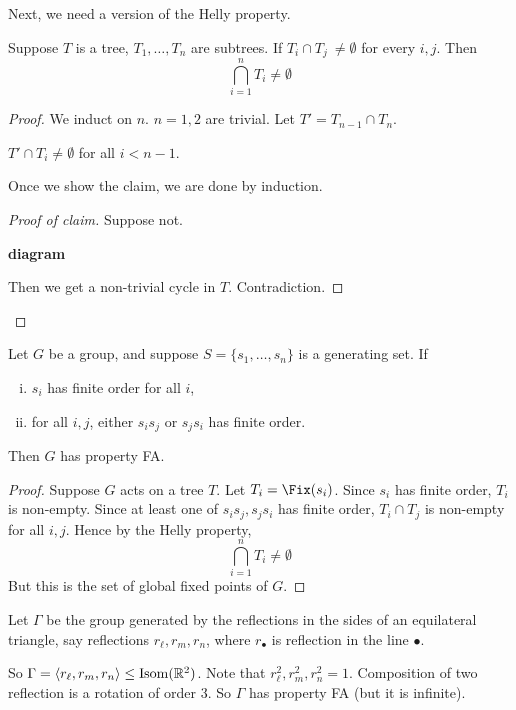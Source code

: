 \documentclass{article}
\begin{document}
\lec

Next, we need a version of the Helly property.

\begin{lemma}
     Suppose \(T\) is a tree, \(T_1, \dots, T_n\) are subtrees. If \(T_i \cap T_j\ \ne \emptyset\) for every \(i, j\). Then
    \[\bigcap_{i=1}^n T_i \ne \emptyset\]
\end{lemma}

\begin{proof}
    We induct on \(n\). \(n = 1, 2\) are trivial. Let \(T' = T_{n-1} \cap T_n\).

    \begin{claim}
        \(T' \cap T_i \ne \emptyset\) for all \(i < n - 1\).
    \end{claim}

    Once we show the claim, we are done by induction.

    \begin{proof}
        [Proof of claim] Suppose not.

        \textbf{diagram}

        Then we get a non-trivial cycle in \(T\). Contradiction.
    \end{proof}
\end{proof}

\begin{theorem}

    Let \(G\) be a group, and suppose \(S = \{s_1, \dots, s_n\}\) is a generating set. If
    \begin{enumerate}[(i)]
        \item \(s_i\) has finite order for all \(i\),
        \item for all \(i, j\), either \(s_is_j\) or \(s_js_i\) has finite order.
    \end{enumerate}
    Then \(G\) has property FA.
\end{theorem}

\begin{proof}
    Suppose \(G\) acts on a tree \(T\). Let \(T_i = \Fix(s_i)\). Since \(s_i\) has finite order, \(T_i\) is non-empty. Since at least one of \(s_is_j, s_js_i\) has finite order, \(T_i \cap T_j\) is non-empty for all \(i, j\). Hence by the Helly property,
    \[\bigcap_{i=1}^n T_i \ne \emptyset\]
    But this is the set of global fixed points of \(G\).
\end{proof}

\begin{example}
    Let \(\Gamma\) be the group generated by the reflections in the sides of an equilateral triangle, say reflections \(r_\ell, r_m, r_n\), where \(r_\bullet\) is reflection in the line \(\bullet\).

    So \(\Gamma = \left\langle r_\ell, r_m, r_n \right\rangle \le \operatorname{Isom}(\mathbb{R}^2)\). Note that \(r_\ell^2, r_m^2, r_n^2 = 1\). Composition of two reflection is a rotation of order 3. So \(\Gamma\) has property FA (but it is infinite).
\end{example}
\end{document}
